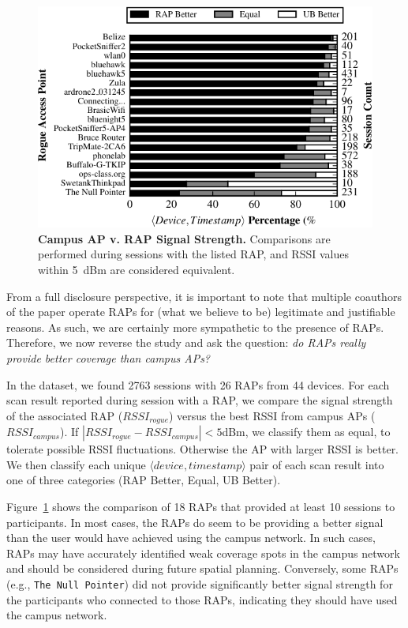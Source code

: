 \begin{figure}[t]
  \centering
  \includegraphics[width=\columnwidth]{./figures/RAPSessionCampusRSSIFigure.pdf}
  \caption{\textbf{Campus AP v. RAP Signal Strength.} Comparisons are
  performed during \wifi{} sessions with the listed RAP, and RSSI values
  within 5~dBm are considered equivalent.}
  \label{fig:rap_session_ub_signal}
\end{figure}

From a full disclosure perspective, it is important to note that multiple coauthors of the
paper operate RAPs for (what we believe to be) legitimate and justifiable reasons.
As such, we are certainly more sympathetic to the presence of RAPs. Therefore, 
we now reverse the study and ask the question: \textit{do RAPs really provide 
better coverage than campus APs?}

In the \ubscan{} dataset, we found \num{2763} \wifi{} sessions with 26 RAPs from
44 devices. For each scan result reported during session with a RAP, we
compare the signal strength of the associated RAP ($RSSI_{rogue}$) versus the
best RSSI from campus APs ($RSSI_{campus}$). If $|RSSI_{rogue}-RSSI_{campus}|
< 5$dBm, we classify them as equal, to tolerate possible RSSI fluctuations.
Otherwise the AP with larger RSSI is better. We then classify each
unique $\langle device, timestamp \rangle$ pair of each scan result into one of 
three categories (RAP Better, Equal, UB Better).  

Figure~\ref{fig:rap_session_ub_signal} shows the comparison of 18 RAPs that
provided at least 10 \wifi{} sessions to \PhoneLab{} participants. In most
cases, the RAPs do seem to be providing a better signal than the user would
have achieved using the campus network. In such cases, RAPs may have
accurately identified weak coverage spots in the campus network and should be
considered during future spatial planning. Conversely, some RAPs (e.g.,
\texttt{The Null Pointer}) did not provide significantly better signal
strength for the \PhoneLab{} participants who connected to those RAPs,
indicating they should have used the campus network.

